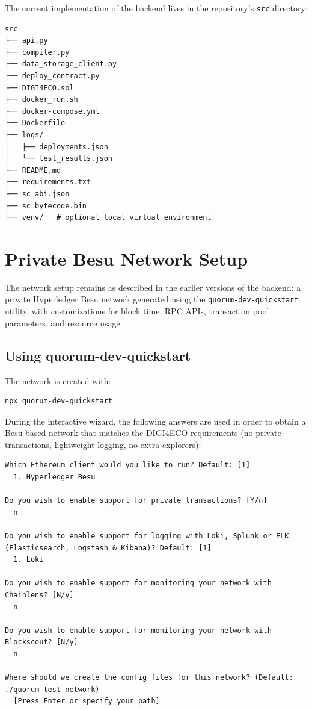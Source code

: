 \documentclass[11pt,a4paper]{article}
\begin{document}
The current implementation of the backend lives in the repository's \texttt{src} directory:

\begin{lstlisting}
src
├── api.py
├── compiler.py
├── data_storage_client.py
├── deploy_contract.py
├── DIGI4ECO.sol
├── docker_run.sh
├── docker-compose.yml
├── Dockerfile
├── logs/
│   ├── deployments.json
│   └── test_results.json
├── README.md
├── requirements.txt
├── sc_abi.json
├── sc_bytecode.bin
└── venv/   # optional local virtual environment
\end{lstlisting}

\section{Private Besu Network Setup}

The network setup remains as described in the earlier versions of the backend: a private Hyperledger Besu network generated using the \texttt{quorum-dev-quickstart} utility, with customizations for block time, RPC APIs, transaction pool parameters, and resource usage.

\subsection{Using quorum-dev-quickstart}

The network is created with:

\begin{lstlisting}
npx quorum-dev-quickstart
\end{lstlisting}

During the interactive wizard, the following answers are used in order to obtain a Besu-based network that matches the DIGI4ECO requirements (no private transactions, lightweight logging, no extra explorers):

\begin{lstlisting}
Which Ethereum client would you like to run? Default: [1]
  1. Hyperledger Besu

Do you wish to enable support for private transactions? [Y/n]
  n

Do you wish to enable support for logging with Loki, Splunk or ELK (Elasticsearch, Logstash & Kibana)? Default: [1]
  1. Loki

Do you wish to enable support for monitoring your network with Chainlens? [N/y]
  n

Do you wish to enable support for monitoring your network with Blockscout? [N/y]
  n

Where should we create the config files for this network? (Default: ./quorum-test-network)
  [Press Enter or specify your path]
\end{lstlisting}
\end{document}
